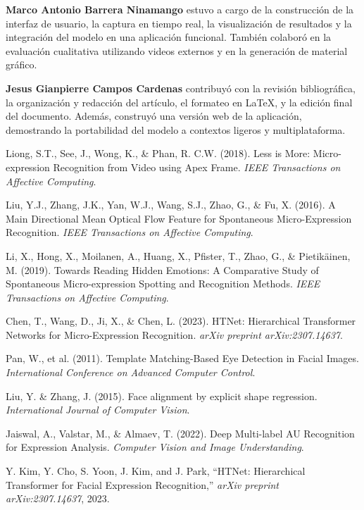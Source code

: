 \documentclass[conference]{IEEEtran}
\begin{document}
\textbf{Marco Antonio Barrera Ninamango} estuvo a cargo de la construcción de la interfaz de usuario, la captura en tiempo real, la visualización de resultados y la integración del modelo en una aplicación funcional. También colaboró en la evaluación cualitativa utilizando videos externos y en la generación de material gráfico.

\textbf{Jesus Gianpierre Campos Cardenas} contribuyó con la revisión bibliográfica, la organización y redacción del artículo, el formateo en \LaTeX{}, y la edición final del documento. Además, construyó una versión web de la aplicación, demostrando la portabilidad del modelo a contextos ligeros y multiplataforma. 



\begin{thebibliography}{9}

Liong, S.T., See, J., Wong, K., \& Phan, R. C.W. (2018).
Less is More: Micro-expression Recognition from Video using Apex Frame.
\textit{IEEE Transactions on Affective Computing}.

Liu, Y.J., Zhang, J.K., Yan, W.J., Wang, S.J., Zhao, G., \& Fu, X. (2016).
A Main Directional Mean Optical Flow Feature for Spontaneous Micro-Expression Recognition.
\textit{IEEE Transactions on Affective Computing}.

Li, X., Hong, X., Moilanen, A., Huang, X., Pfister, T., Zhao, G., \& Pietikäinen, M. (2019).
Towards Reading Hidden Emotions: A Comparative Study of Spontaneous Micro-expression Spotting and Recognition Methods.
\textit{IEEE Transactions on Affective Computing}.

Chen, T., Wang, D., Ji, X., \& Chen, L. (2023).
HTNet: Hierarchical Transformer Networks for Micro-Expression Recognition.
\textit{arXiv preprint arXiv:2307.14637}.

Pan, W., et al. (2011).
Template Matching-Based Eye Detection in Facial Images.
\textit{International Conference on Advanced Computer Control}.

Liu, Y. \& Zhang, J. (2015).
Face alignment by explicit shape regression.
\textit{International Journal of Computer Vision}.

Jaiswal, A., Valstar, M., \& Almaev, T. (2022).
Deep Multi-label AU Recognition for Expression Analysis.
\textit{Computer Vision and Image Understanding}.

Y. Kim, Y. Cho, S. Yoon, J. Kim, and J. Park, ``HTNet: Hierarchical Transformer for Facial Expression Recognition,'' \textit{arXiv preprint arXiv:2307.14637}, 2023.


\end{thebibliography}
\end{document}
